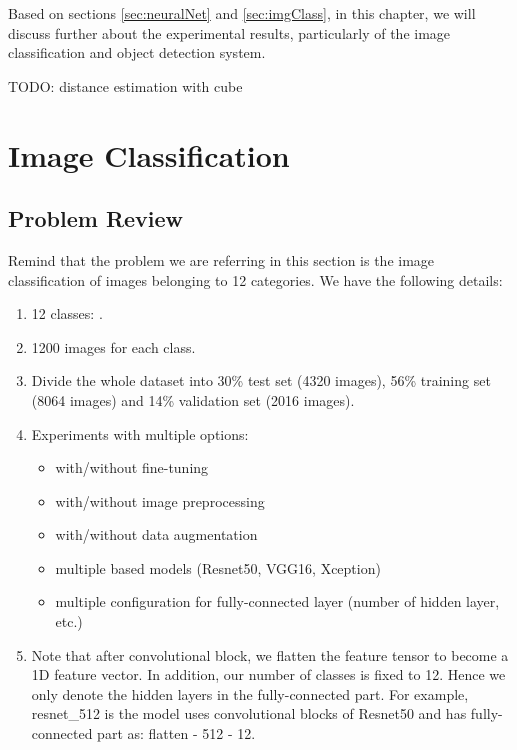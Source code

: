 \label{chap:ExpRes}
Based on sections \ref{sec:neuralNet} and \ref{sec:imgClass}, in this chapter, we will discuss further about the experimental results, particularly of the image classification and object detection system.


TODO: distance estimation with cube

\section{Image Classification}
\subsection{Problem Review}
Remind that the problem we are referring in this section is the image classification of images belonging to 12 categories. We have the following details:
\begin{enumerate}
	\item 12 classes: .
	\item 1200 images for each class.
	\item Divide the whole dataset into 30\% test set (4320 images), 56\% training set (8064 images) and 14\% validation set (2016 images).
	\item Experiments with multiple options: 
	\begin{itemize}
		\item with/without fine-tuning
		\item with/without image preprocessing
		\item with/without data augmentation
		\item multiple based models (Resnet50, VGG16, Xception)
		\item multiple configuration for fully-connected layer (number of hidden layer, etc.)
	\end{itemize} 
	\item Note that after convolutional block, we flatten the feature tensor to become a 1D feature vector. In addition, our number of classes is fixed to 12. Hence we only denote the hidden layers in the fully-connected part. For example, resnet\_512 is the model uses convolutional blocks of Resnet50 and has fully-connected part as: flatten - 512 - 12. 
\end{enumerate}


